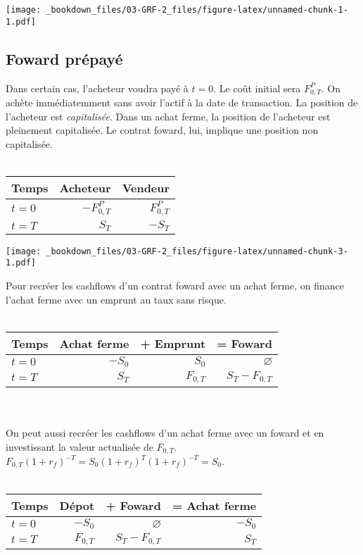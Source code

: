 \texttt{[image: \_bookdown\_files/03-GRF-2\_files/figure-latex/unnamed-chunk-1-1.pdf]} 


\subsection{Foward prépayé}\label{foward-prepaye}

Dans certain cas, l'acheteur voudra payé à \(t=0\). Le coût initial sera
\(F_{0,T}^P\). On achète immédiatemment sans avoir l'actif à la date de
transaction. La position de l'acheteur est \emph{capitalisée}. Dans un
achat ferme, la position de l'acheteur est pleinement capitalisée. Le
contrat foward, lui, implique une position non capitalisée.\\
\\


\begin{tabularx}{0.5\textwidth}{Xrr}
\hline
Temps & Acheteur & Vendeur \\
\hline
$t=0$ & $-F_{0,T}^P$ & $F_{0,T}^P$ \\
$t=T$ & $S_T$ & $-S_T$ \\
\hline
\end{tabularx}

\texttt{[image: \_bookdown\_files/03-GRF-2\_files/figure-latex/unnamed-chunk-3-1.pdf]} 

Pour recréer les cashflows d'un contrat foward avec un achat ferme, on
finance l'achat ferme avec un emprunt au taux sans risque.\\
\\


\begin{tabular}{lrrr}
\hline
Temps & Achat ferme & + Emprunt & = Foward \\
\hline
$t=0$ & $-S_0$ & $S_0$ & $\varnothing$ \\
$t=T$ & $S_T$ & $F_{0,T}$ & $S_T - F_{0,T}$ \\
\hline
\end{tabular}\\
\\



On peut aussi recréer les cashflows d'un achat ferme avec un foward et
en investissant la valeur actualisée de \(F_{0,T}\).\\
\(F_{0,T}(1+r_f)^{-T}=S_0(1+r_f)^{T}(1+r_f)^{-T}=S_0\).\\
\\


\begin{tabular}{lrrr}
\hline
Temps & Dépot & + Foward & = Achat ferme \\
\hline
$t=0$ & $-S_0$ & $\varnothing$ & $-S_0$ \\
$t=T$ & $F_{0,T}$ & $S_T - F_{0,T}$ & $S_T$ \\
\hline
\end{tabular}


